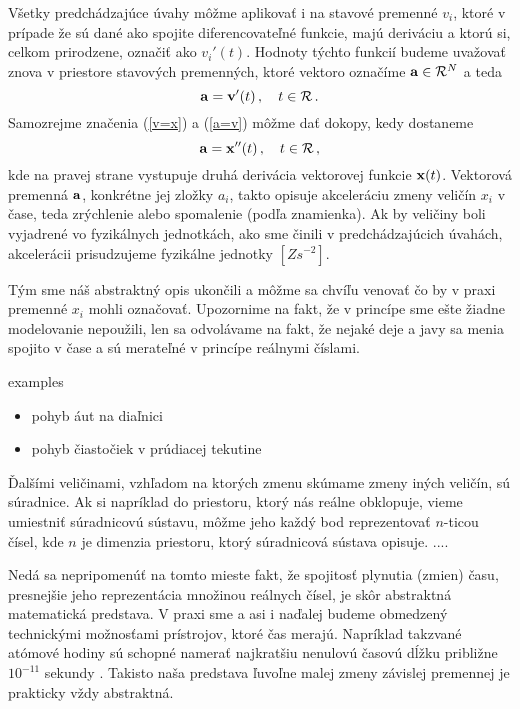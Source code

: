 Všetky predchádzajúce úvahy môžme aplikovať i na stavové premenné $v_i$, ktoré v prípade že sú dané ako spojite diferencovateľné funkcie, majú deriváciu a ktorú si, celkom prirodzene, označiť ako $v_i'(t)$. Hodnoty týchto funkcií budeme uvažovať znova v priestore stavových premenných, ktoré vektoro označíme ${\bf a} \in {\mathcal R}^N$ a teda
\begin{equation}
\label{a=v}
{\bf a} = {\bf v}'(t) \,, \quad t \in \mathcal{R} \,.
\end{equation}
Samozrejme značenia (\ref{v=x}) a (\ref{a=v}) môžme dať dokopy, kedy dostaneme
\begin{equation}
\label{a=x}
{\bf a} = {\bf x}''(t) \,, \quad t \in \mathcal{R} \,,
\end{equation}
kde na pravej strane vystupuje druhá derivácia vektorovej funkcie ${\bf x}(t)$. Vektorová premenná $\bf a$, konkrétne jej zložky $a_i$, takto opisuje akceleráciu zmeny veličín $x_i$ v čase, teda zrýchlenie alebo spomalenie (podľa znamienka). Ak by veličiny boli vyjadrené vo fyzikálnych jednotkách, ako sme činili v predchádzajúcich úvahách, akcelerácii prisudzujeme fyzikálne jednotky $[Z s^{-2}]$.

Tým sme náš abstraktný opis ukončili a môžme sa chvíľu venovať čo by v praxi premenné $x_i$ mohli označovať. Upozornime na fakt, že v princípe sme ešte žiadne modelovanie nepoužili, len sa odvolávame na fakt, že nejaké deje a javy sa menia spojito v čase a sú merateľné v princípe reálnymi číslami.

\begin{pr}
examples
\begin{itemize}
\item pohyb áut na diaľnici
\item pohyb čiastočiek v prúdiacej tekutine
\end{itemize}
\end{pr}

\begin{pz}
Ďalšími veličinami, vzhľadom na ktorých zmenu skúmame zmeny iných veličín, sú súradnice. Ak si napríklad do priestoru, ktorý nás reálne obklopuje, vieme umiestniť súradnicovú sústavu, môžme jeho každý bod reprezentovať $n$-ticou čísel, kde $n$ je dimenzia priestoru, ktorý súradnicová sústava opisuje. ....
\end{pz}

Nedá sa nepripomenúť na tomto mieste fakt, že spojitosť plynutia (zmien) času, presnejšie jeho reprezentácia množinou reálnych čísel, je skôr abstraktná matematická predstava. V praxi sme a asi i naďalej budeme obmedzený technickými možnosťami prístrojov, ktoré čas merajú. Napríklad takzvané atómové hodiny sú schopné namerať najkratšiu nenulovú časovú dĺžku približne $10^{-11}$ sekundy \cite{wiki:atom}. 
Takisto naša predstava ľuvoľne malej zmeny závislej premennej  je prakticky vždy abstraktná. 

